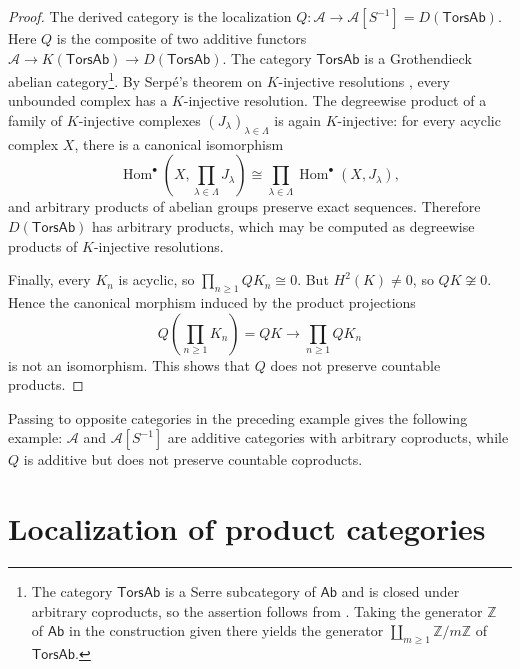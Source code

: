 \documentclass[10pt,a4paper]{amsart}
\theoremstyle{plain}
\theoremstyle{definition}
\theoremstyle{remark}
\begin{document}
\begin{proof}
  The derived category is the localization $Q : \mathcal{A} \longrightarrow \mathcal A[S^{-1}]=D(\mathsf{TorsAb})$.
  Here $Q$ is the composite of two additive functors $\mathcal A\longrightarrow K(\mathsf{TorsAb}) \longrightarrow D(\mathsf{TorsAb})$.
  The category $\mathsf{TorsAb}$ is a Grothendieck abelian category\footnote{The category $\mathsf{TorsAb}$ is a Serre subcategory of $\mathsf{Ab}$ and is closed under arbitrary coproducts, so the assertion follows from \cite[Proposition~2.2.16 and its proof, pp.~36--37]{KrauseHomologicalTheory}. Taking the generator $\mathbb Z$ of $\mathsf{Ab}$ in the construction given there yields the generator $\coprod_{m\geq1}\mathbb Z/m\mathbb Z$ of $\mathsf{TorsAb}$.}.
  By Serp\'e's theorem on $K$-injective resolutions \cite[Theorem~3.13]{SerpeKInjective}, every unbounded complex has a $K$-injective resolution.
  The degreewise product of a family of $K$-injective complexes $(J_\lambda)_{\lambda\in\Lambda}$ is again $K$-injective: for every acyclic complex $X$, there is a canonical isomorphism
  \[
    \operatorname{Hom}^{\bullet}\!\left(X,\prod_{\lambda\in\Lambda}J_\lambda\right)
    \cong
    \prod_{\lambda\in\Lambda}\operatorname{Hom}^{\bullet}(X,J_\lambda),
  \]
  and arbitrary products of abelian groups preserve exact sequences.
  Therefore $D(\mathsf{TorsAb})$ has arbitrary products, which may be computed as degreewise products of $K$-injective resolutions.

  \medskip

  Finally, every $K_n$ is acyclic, so $\prod_{n\geq1}QK_n\cong0$.
  But $H^2(K)\neq0$, so $QK\not\cong0$.
  Hence the canonical morphism induced by the product projections
  \[
    Q\left(\prod_{n\geq1}K_n\right)
    =QK
    \longrightarrow
    \prod_{n\geq1}QK_n
  \]
  is not an isomorphism.
  This shows that $Q$ does not preserve countable products.
\end{proof}

Passing to opposite categories in the preceding example gives the following example: $\mathcal{A}$ and $\mathcal{A}[S^{-1}]$ are additive categories with arbitrary coproducts, while $Q$ is additive but does not preserve countable coproducts.

\section{Localization of product categories}\label{sec:product-localization}
\end{document}
